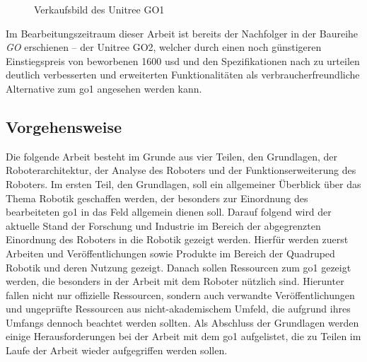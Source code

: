 \begin{figure}[h]
    \caption[Verkaufsbild des Unitree GO1]{Verkaufsbild des Unitree GO1\footnotemark}\label{fig:go1-ad-foto}
\end{figure}


Im Bearbeitungszeitraum dieser Arbeit ist bereits der Nachfolger in der Baureihe \emph{GO} erschienen -- der Unitree GO2,
welcher durch einen noch günstigeren Einstiegspreis von beworbenen \num{1600} \gls{usd} und den Spezifikationen nach zu urteilen
deutlich verbesserten und erweiterten Funktionalitäten als verbraucherfreundliche Alternative zum \gls{go1} angesehen
werden kann.

\subsection{Vorgehensweise}
\label{subsec:intro-vorgehensweise}

Die folgende Arbeit besteht im Grunde aus vier Teilen, den Grundlagen, der Roboterarchitektur, der Analyse des Roboters
und der Funktionserweiterung des Roboters.
Im ersten Teil, den Grundlagen, soll ein allgemeiner Überblick über das Thema Robotik geschaffen werden, der besonders zur
Einordnung des bearbeiteten \gls{go1} in das Feld allgemein dienen soll.
Darauf folgend wird der aktuelle Stand der Forschung und Industrie im Bereich der abgegrenzten Einordnung des Roboters
in die Robotik gezeigt werden.
Hierfür werden zuerst Arbeiten und Veröffentlichungen sowie Produkte im Bereich der Quadruped Robotik und deren Nutzung
gezeigt.
Danach sollen Ressourcen zum \gls{go1} gezeigt werden, die besonders in der Arbeit mit dem Roboter nützlich sind.
Hierunter fallen nicht nur offizielle Ressourcen, sondern auch verwandte Veröffentlichungen und ungeprüfte Ressourcen
aus nicht-akademischem Umfeld, die aufgrund ihres Umfangs dennoch beachtet werden sollten.
Als Abschluss der Grundlagen werden einige Herausforderungen bei der Arbeit mit dem \gls{go1} aufgelistet, die zu Teilen
im Laufe der Arbeit wieder aufgegriffen werden sollen.

